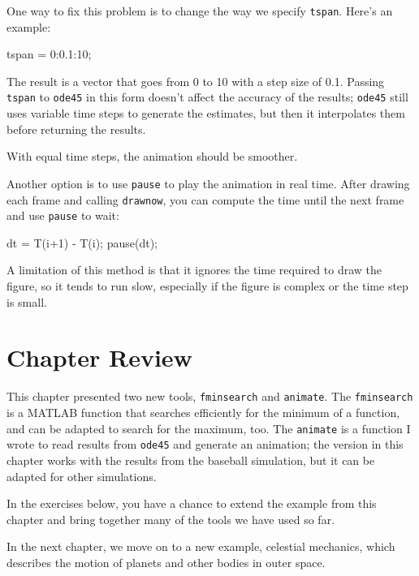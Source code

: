 
One way to fix this problem is to change the way we specify \lstinline{tspan}.
Here's an example:

\begin{code}
    tspan = 0:0.1:10;
\end{code}

The result is a vector that goes from 0 to 10 with a step size of 0.1.  
Passing \lstinline{tspan} to \lstinline{ode45} in this form doesn't affect the accuracy of the results; 
\lstinline{ode45} still uses variable time steps to generate the estimates, but then it interpolates them before returning the results.


With equal time steps, the animation should be smoother.

Another option is to use \lstinline{pause} to play the animation in
real time.  After drawing each frame and calling
\lstinline{drawnow}, you can compute the time
until the next frame and use \lstinline{pause} to wait:

\begin{code}
    dt = T(i+1) - T(i);
    pause(dt);
\end{code}

A limitation of this method is that it ignores the time required to
draw the figure, so it tends to run slow, especially if the figure is
complex or the time step is small.

\section{Chapter Review}

This chapter presented two new tools, \lstinline{fminsearch} and \lstinline{animate}.  
The \lstinline{fminsearch} is a MATLAB function that searches efficiently for the minimum of a function, and can be adapted to search for the maximum, too.
The \lstinline{animate} is a function I wrote to read results from \lstinline{ode45} and generate an animation; the version in this chapter works with the results from the baseball simulation, but it can be adapted for other simulations.

In the exercises below, you have a chance to extend the example from this chapter and bring together many of the tools we have used so far.

In the next chapter, we move on to a new example, celestial mechanics, which describes the motion of planets and other bodies in outer space.


